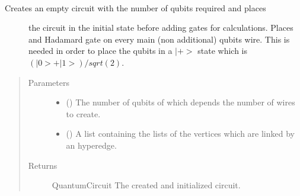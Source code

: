 \documentclass[letterpaper,10pt,english]{sphinxmanual}
\begin{document}

\begin{fulllineitems}
\label{\detokenize{hypergraphstates:mermin_on_qiskit.hypergraphstates.circuit_initialisation}}~\begin{description}
\item[{Creates an empty circuit with the number of qubits required and places }] \leavevmode
the circuit in the initial state before adding gates for calculations.
Places and Hadamard gate on every main (non additional) qubits wire.
This is needed in order to place the qubits in a \(|+>\) state which is
\((|0> + |1>) / sqrt(2)\).

\end{description}
\begin{quote}\begin{description}
\item[{Parameters}] \leavevmode\begin{itemize}
\item {} 
 () \textendash{} The number of qubits of which depends the number of wires to 
create.

\item {} 
 (\sphinxstyleliteralemphasis{\sphinxupquote{{[}}}\sphinxstyleliteralemphasis{\sphinxupquote{{[}}}\sphinxstyleliteralemphasis{\sphinxupquote{{]}}}\sphinxstyleliteralemphasis{\sphinxupquote{{]}}}) \textendash{} A list containing the lists of the 
vertices which are linked by an hyperedge.

\end{itemize}

\item[{Returns}] \leavevmode
QuantumCircuit \textendash{} The created and initialized circuit.

\end{description}\end{quote}

\end{fulllineitems}
\end{document}
